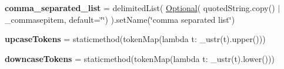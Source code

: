 \begin{DoxyCompactItemize}
{\bfseries comma\+\_\+separated\+\_\+list} = delimited\+List( \hyperlink{classpkg__resources_1_1__vendor_1_1pyparsing_1_1_optional}{Optional}( quoted\+String.\+copy() $\vert$ \+\_\+commasepitem, default=\char`\"{}\char`\"{}) ).set\+Name(\char`\"{}comma separated list\char`\"{})
\item 
\mbox{\label{classpkg__resources_1_1__vendor_1_1pyparsing_1_1pyparsing__common_af6af6495738fa976cbf61f53d2cc18fe}} 
{\bfseries upcase\+Tokens} = staticmethod(token\+Map(lambda t\+: \+\_\+ustr(t).upper()))
\item 
\mbox{\label{classpkg__resources_1_1__vendor_1_1pyparsing_1_1pyparsing__common_a0e00d52e7790dabaf5fd7f015c4ec35d}} 
{\bfseries downcase\+Tokens} = staticmethod(token\+Map(lambda t\+: \+\_\+ustr(t).lower()))
\end{DoxyCompactItemize}


